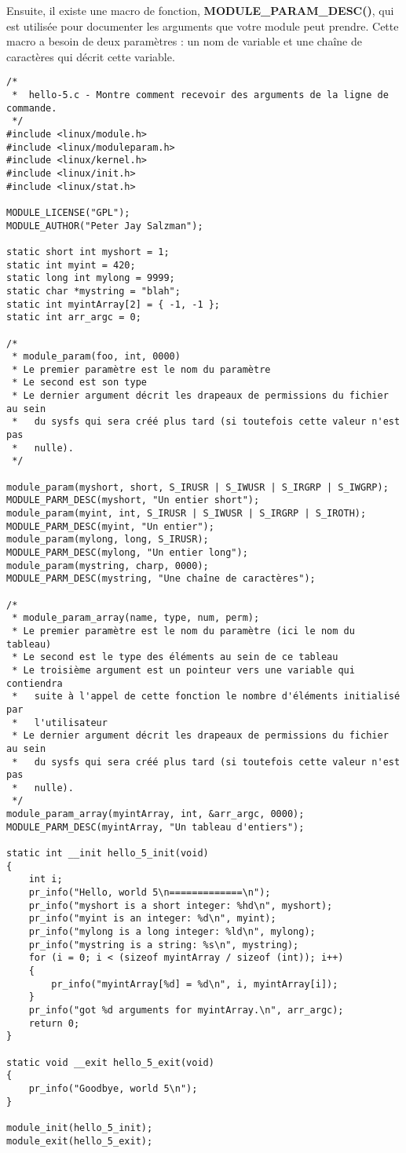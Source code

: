 \documentclass[11pt]{article}
\begin{document}
Ensuite, il existe une macro de fonction, \textbf{MODULE\_PARAM\_DESC()}, qui est utilisée pour documenter les arguments que votre module peut prendre. Cette macro a besoin de deux paramètres : un nom de variable et une chaîne de caractères qui décrit cette variable.

\begin{verbatim}
/*
 *  hello-5.c - Montre comment recevoir des arguments de la ligne de commande.
 */
#include <linux/module.h>
#include <linux/moduleparam.h>
#include <linux/kernel.h>
#include <linux/init.h>
#include <linux/stat.h>

MODULE_LICENSE("GPL");
MODULE_AUTHOR("Peter Jay Salzman");

static short int myshort = 1;
static int myint = 420;
static long int mylong = 9999;
static char *mystring = "blah";
static int myintArray[2] = { -1, -1 };
static int arr_argc = 0;

/*
 * module_param(foo, int, 0000)
 * Le premier paramètre est le nom du paramètre
 * Le second est son type
 * Le dernier argument décrit les drapeaux de permissions du fichier au sein
 *   du sysfs qui sera créé plus tard (si toutefois cette valeur n'est pas
 *   nulle).
 */

module_param(myshort, short, S_IRUSR | S_IWUSR | S_IRGRP | S_IWGRP);
MODULE_PARM_DESC(myshort, "Un entier short");
module_param(myint, int, S_IRUSR | S_IWUSR | S_IRGRP | S_IROTH);
MODULE_PARM_DESC(myint, "Un entier");
module_param(mylong, long, S_IRUSR);
MODULE_PARM_DESC(mylong, "Un entier long");
module_param(mystring, charp, 0000);
MODULE_PARM_DESC(mystring, "Une chaîne de caractères");

/*
 * module_param_array(name, type, num, perm);
 * Le premier paramètre est le nom du paramètre (ici le nom du tableau)
 * Le second est le type des éléments au sein de ce tableau
 * Le troisième argument est un pointeur vers une variable qui contiendra
 *   suite à l'appel de cette fonction le nombre d'éléments initialisé par
 *   l'utilisateur
 * Le dernier argument décrit les drapeaux de permissions du fichier au sein
 *   du sysfs qui sera créé plus tard (si toutefois cette valeur n'est pas
 *   nulle).
 */
module_param_array(myintArray, int, &arr_argc, 0000);
MODULE_PARM_DESC(myintArray, "Un tableau d'entiers");

static int __init hello_5_init(void)
{
    int i;
    pr_info("Hello, world 5\n=============\n");
    pr_info("myshort is a short integer: %hd\n", myshort);
    pr_info("myint is an integer: %d\n", myint);
    pr_info("mylong is a long integer: %ld\n", mylong);
    pr_info("mystring is a string: %s\n", mystring);
    for (i = 0; i < (sizeof myintArray / sizeof (int)); i++)
    {
        pr_info("myintArray[%d] = %d\n", i, myintArray[i]);
    }
    pr_info("got %d arguments for myintArray.\n", arr_argc);
    return 0;
}

static void __exit hello_5_exit(void)
{
    pr_info("Goodbye, world 5\n");
}

module_init(hello_5_init);
module_exit(hello_5_exit);
\end{verbatim}
\end{document}

